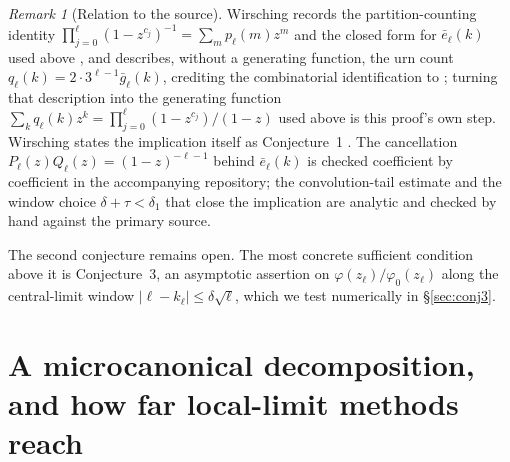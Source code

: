 \documentclass[11pt]{article}
\theoremstyle{remark}
\newtheorem{remark}[theorem]{Remark}
\begin{document}
\begin{remark}[Relation to the source]\label{rem:wirsching-conj1-source}
Wirsching records the partition-counting identity
$\prod_{j=0}^\ell(1-z^{c_j})^{-1}=\sum_mp_\ell(m)z^m$
\cite[\S2, eq.~(2.2)]{Wirsching2003} and the closed
form for $\bar e_\ell(k)$ used above \cite[\S1, eq.~(1.4)]{Wirsching2003},
and describes, without a generating function, the urn count
$q_\ell(k)=2\cdot3^{\ell-1}\bar g_\ell(k)$, crediting the combinatorial
identification to \cite{Wirsching1998Urns} \cite[\S2]{Wirsching2003};
turning that description into the generating function
$\sum_kq_\ell(k)z^k=\prod_{j=0}^\ell(1-z^{c_j})/(1-z)$ used above is
this proof's own step. Wirsching states the implication itself as
Conjecture~1 \cite[\S\S1--2]{Wirsching2003}. The cancellation
$P_\ell(z)Q_\ell(z)=(1-z)^{-\ell-1}$ behind $\bar e_\ell(k)$ is
checked coefficient by coefficient in the accompanying repository;
the convolution-tail estimate and the window choice
$\delta+\tau<\delta_1$ that close the implication are analytic and
checked by hand against the primary source.
\end{remark}

The second conjecture remains open. The most concrete sufficient
condition above it is Conjecture~3, an asymptotic assertion on
$\varphi(z_\ell)/\varphi_0(z_\ell)$ along the central-limit window
$|\ell-k_\ell|\le\delta\sqrt\ell$, which we test numerically in
\S\ref{sec:conj3}.

\section{A microcanonical decomposition, and how far local-limit methods reach}
\label{sec:microcanonical}
\end{document}
